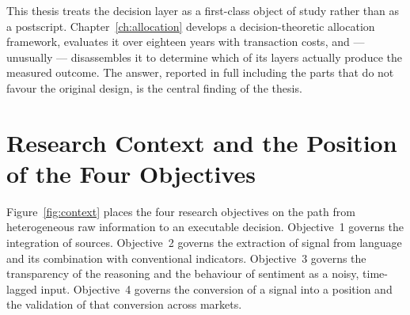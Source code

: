 This thesis treats the decision layer as a first-class object of study rather than as a
postscript. Chapter~\ref{ch:allocation} develops a decision-theoretic allocation framework,
evaluates it over eighteen years with transaction costs, and --- unusually --- disassembles it
to determine which of its layers actually produce the measured outcome. The answer, reported
in full including the parts that do not favour the original design, is the central finding of
the thesis.

\section{Research Context and the Position of the Four Objectives}

Figure~\ref{fig:context} places the four research objectives on the path from heterogeneous
raw information to an executable decision. Objective~1 governs the integration of sources.
Objective~2 governs the extraction of signal from language and its combination with
conventional indicators. Objective~3 governs the transparency of the reasoning and the
behaviour of sentiment as a noisy, time-lagged input. Objective~4 governs the conversion of a
signal into a position and the validation of that conversion across markets.

